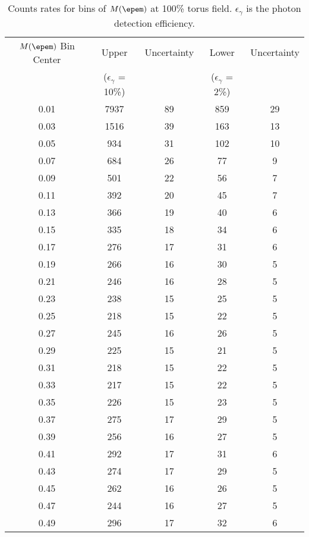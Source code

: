 \begin{table}[h!]
\begin{minipage}{\textwidth}
\begin{center}

\caption[Expected count rates]{\label{tab:countsfull}Counts rates for bins of $M(\epem)$ at 100\% torus field. $\epsilon_\gamma$ is the photon detection efficiency.\vspace{0.75mm}}

\begin{tabular}{c|c|c|c|c}

\hline
$M(\epem)$ Bin Center & Upper & Uncertainty & Lower  & Uncertainty \\
& ($\epsilon_\gamma$ = 10\%) &   &($\epsilon_\gamma$ = 2\%)& \\
\hline
0.01  & 7937  & 89  & 859  & 29\\
0.03  & 1516  & 39  & 163  & 13\\
0.05  & 934  & 31  & 102  & 10\\
0.07  & 684  & 26  & 77  & 9\\
0.09  & 501  & 22  & 56  & 7\\
0.11  & 392  & 20  & 45  & 7\\
0.13  & 366  & 19  & 40  & 6\\
0.15  & 335  & 18  & 34  & 6\\
0.17  & 276  & 17  & 31  & 6\\
0.19  & 266  & 16  & 30  & 5\\
0.21  & 246  & 16  & 28  & 5\\
0.23  & 238  & 15  & 25  & 5\\
0.25  & 218  & 15  & 22  & 5\\
0.27  & 245  & 16  & 26  & 5\\
0.29  & 225  & 15  & 21  & 5\\
0.31  & 218  & 15  & 22  & 5\\
0.33  & 217  & 15  & 22  & 5\\
0.35  & 226  & 15  & 23  & 5\\
0.37  & 275  & 17  & 29  & 5\\
0.39  & 256  & 16  & 27  & 5\\
0.41  & 292  & 17  & 31  & 6\\
0.43  & 274  & 17  & 29  & 5\\
0.45  & 262  & 16  & 26  & 5\\
0.47  & 244  & 16  & 27  & 5\\
0.49  & 296  & 17  & 32  & 6\\

\end{tabular}
\end{center}
\end{minipage}
\end{table}
